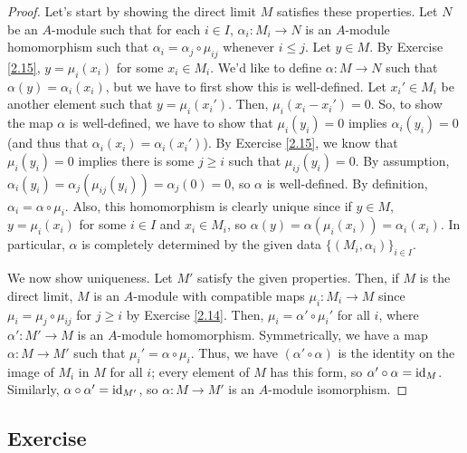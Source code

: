 \begin{proof}
Let's start by showing the direct limit $M$ satisfies these properties. Let $N$ be an $A$-module such that for each $i \in I$, $\alpha_i : M_i \to N$ is an $A$-module homomorphism
such that $\alpha_i = \alpha_j \circ \mu_{ij}$ whenever $i \le j$. Let $y \in M$. By Exercise \ref{2.15}, $y = \mu_i(x_i)$ for some $x_i \in M_i$. We'd like to define $\alpha : M \to N$
such that $\alpha(y) = \alpha_i(x_i)$, but we have to first show this is well-defined. Let $x_i' \in M_i$ be another element such that $y = \mu_i(x_i')$. Then, $\mu_i(x_i - x_i') = 0$. So,
to show the map $\alpha$ is well-defined, we have to show that $\mu_i(y_i) = 0$ implies $\alpha_i(y_i) = 0$ (and thus that $\alpha_i(x_i) = \alpha_i(x_i')$). By Exercise \ref{2.15}, we know that $\mu_i(y_i) = 0$ 
implies there is some $j \ge i$ such that $\mu_{ij}(y_i) = 0$. By assumption, $\alpha_i(y_i) = \alpha_j(\mu_{ij}(y_i)) = \alpha_j(0) = 0$, so $\alpha$ is well-defined. By definition, $\alpha_i = \alpha \circ \mu_i$.
Also, this homomorphism is clearly unique since if $y \in M$, $y = \mu_i(x_i)$ for some $i \in I$ and $x_i \in M_i$, so $\alpha(y) = \alpha(\mu_i(x_i)) = \alpha_i(x_i)$. In particular, $\alpha$
is completely determined by the given data $\{(M_i,\alpha_i)\}_{i \in I}$.

We now show uniqueness. Let $M'$ satisfy the given properties. Then, if $M$ is the direct limit, $M$ is an $A$-module with compatible maps $\mu_i : M_i \to M$ since $\mu_i = \mu_j \circ \mu_{ij}$ for 
$j \ge i$ by Exercise \ref{2.14}. Then, $\mu_i = \alpha' \circ \mu_i'$ for all $i$, where $\alpha' : M' \to M$ is an $A$-module homomorphism. Symmetrically, we have a map $\alpha : M \to M'$
such that $\mu_i' = \alpha \circ \mu_i$. Thus, we have $(\alpha' \circ \alpha)$ is the identity on the image of $M_i$ in $M$ for all $i$; every element of $M$ has this form, so $\alpha' \circ \alpha = \operatorname{id}_M$.
Similarly, $\alpha \circ \alpha' = \operatorname{id}_{M'}$, so $\alpha : M \to M'$ is an $A$-module isomorphism.
\end{proof}

\subsection{Exercise}\label{2.17} %

